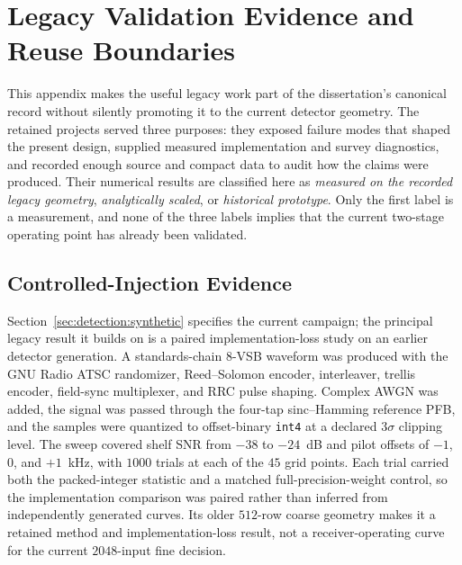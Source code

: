 \chapter{Legacy Validation Evidence and Reuse Boundaries}
\label{app:legacy}

This appendix makes the useful legacy work part of the dissertation's canonical
record without silently promoting it to the current detector geometry.  The
retained projects served three purposes: they exposed failure modes that shaped
the present design, supplied measured implementation and survey diagnostics, and
recorded enough source and compact data to audit how the claims were produced.
Their numerical results are classified here as \emph{measured on the recorded
legacy geometry}, \emph{analytically scaled}, or \emph{historical prototype}.
Only the first label is a measurement, and none of the three labels implies that
the current two-stage operating point has already been validated.

\section{Controlled-Injection Evidence}
\label{app:legacy:injection}

Section~\ref{sec:detection:synthetic} specifies the current campaign; the
principal legacy result it builds on is a paired implementation-loss study on
an earlier detector generation.  A standards-chain 8-VSB waveform was produced
with the GNU Radio ATSC randomizer, Reed--Solomon encoder, interleaver, trellis
encoder, field-sync multiplexer, and RRC pulse shaping.  Complex AWGN was
added, the signal was passed through the four-tap sinc--Hamming reference PFB,
and the samples were quantized to offset-binary \texttt{int4} at a declared
$3\sigma$ clipping level.  The sweep covered shelf SNR from $-38$ to $-24$~dB
and pilot offsets of $-1$, $0$, and $+1$~kHz, with $1000$ trials at each of the
$45$ grid points.  Each trial carried both the packed-integer statistic and a
matched full-precision-weight control, so the implementation comparison was
paired rather than inferred from independently generated curves.  Its older
$512$-row coarse geometry makes it a retained method and implementation-loss
result, not a receiver-operating curve for the current $2048$-input fine
decision.

